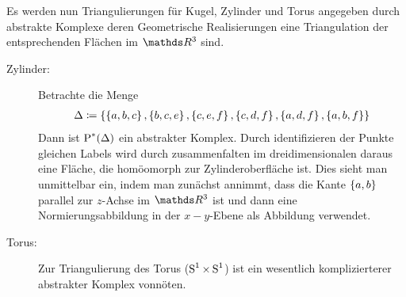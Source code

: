 \begin{Bsp}[Triangulation]
  Es werden nun Triangulierungen für Kugel, Zylinder und Torus
  angegeben durch abstrakte Komplexe deren Geometrische Realisierungen
  eine Triangulation der entsprechenden Flächen im $\R^3$ sind.

  \begin{description}
  \item[Zylinder:] Betrachte die Menge
    \begin{gather*}
      \Delta \coloneqq
      \sset{\sset{a,b,c},\sset{b,c,e},\sset{c,e,f},\sset{c,d,f}%
        ,\sset{a,d,f},\sset{a,b,f}}
    \end{gather*}
    Dann ist $\operatorname{P}^*(\Delta)$ ein abstrakter Komplex.  Durch
    identifizieren der Punkte gleichen Labels wird durch
    zusammenfalten im dreidimensionalen daraus eine Fläche, die
    homöomorph zur Zylinderoberfläche ist. Dies sieht man unmittelbar
    ein, indem man zunächst annimmt, dass die Kante $\left\{ a,b \right\}$
    parallel zur $z$-Achse im $\R^3$ ist und dann eine
    Normierungsabbildung in der $x-y$-Ebene als Abbildung verwendet.
    \newline
  \begin{center}
      \parbox{0.7\linewidth}{%
      \hfill
      }
    \end{center}
  \item[Torus:] Zur Triangulierung des Torus ($\operatorname{S}^1 \times \operatorname{S}^1$)
    ist ein wesentlich komplizierterer abstrakter Komplex
    vonnöten.


\end{description}
\end{Bsp}
